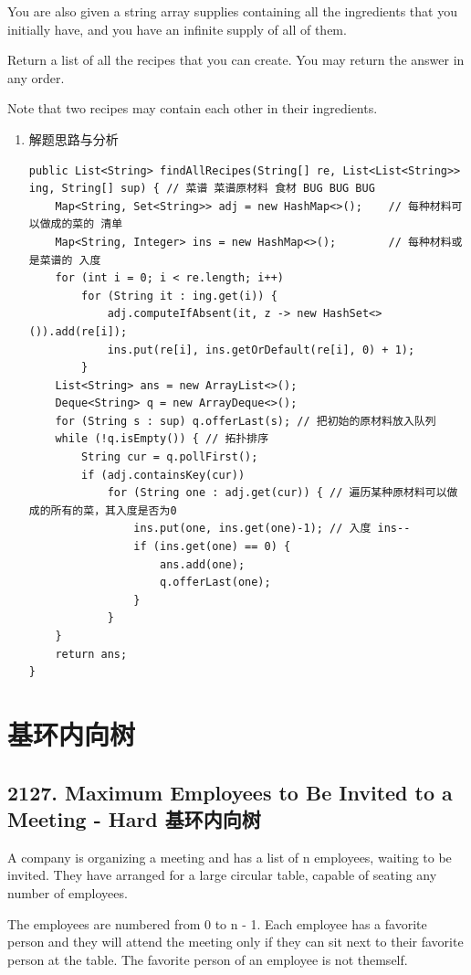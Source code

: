 \documentclass[9pt, b5paaper]{book}
\begin{document}
You are also given a string array supplies containing all the ingredients that you initially have, and you have an infinite supply of all of them.

Return a list of all the recipes that you can create. You may return the answer in any order.

Note that two recipes may contain each other in their ingredients.
\begin{enumerate}
\item 解题思路与分析
\label{sec-1-1-8-1}
\begin{verbatim}
public List<String> findAllRecipes(String[] re, List<List<String>> ing, String[] sup) { // 菜谱 菜谱原材料 食材 BUG BUG BUG
    Map<String, Set<String>> adj = new HashMap<>();    // 每种材料可以做成的菜的 清单
    Map<String, Integer> ins = new HashMap<>();        // 每种材料或是菜谱的 入度
    for (int i = 0; i < re.length; i++) 
        for (String it : ing.get(i)) {
            adj.computeIfAbsent(it, z -> new HashSet<>()).add(re[i]);
            ins.put(re[i], ins.getOrDefault(re[i], 0) + 1);
        }
    List<String> ans = new ArrayList<>();
    Deque<String> q = new ArrayDeque<>();
    for (String s : sup) q.offerLast(s); // 把初始的原材料放入队列
    while (!q.isEmpty()) { // 拓扑排序
        String cur = q.pollFirst();
        if (adj.containsKey(cur)) 
            for (String one : adj.get(cur)) { // 遍历某种原材料可以做成的所有的菜，其入度是否为0
                ins.put(one, ins.get(one)-1); // 入度 ins--
                if (ins.get(one) == 0) {
                    ans.add(one);
                    q.offerLast(one);
                }
            }
    }
    return ans;
}
\end{verbatim}
\end{enumerate}

\section{基环内向树}
\label{sec-1-2}
\subsection{2127. Maximum Employees to Be Invited to a Meeting - Hard 基环内向树}
\label{sec-1-2-1}
A company is organizing a meeting and has a list of n employees, waiting to be invited. They have arranged for a large circular table, capable of seating any number of employees.

The employees are numbered from 0 to n - 1. Each employee has a favorite person and they will attend the meeting only if they can sit next to their favorite person at the table. The favorite person of an employee is not themself.
\end{document}

